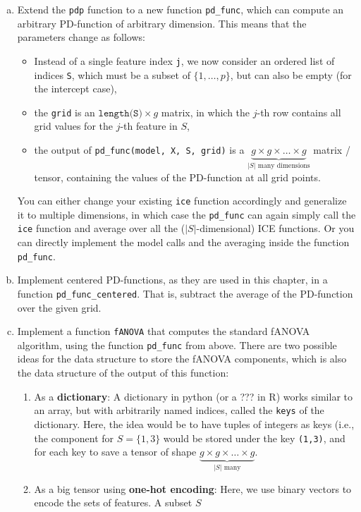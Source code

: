 {\begin{enumerate}[a)]
    \item
    Extend the \texttt{pdp} function to a new function \texttt{pd\_func}, which can compute an arbitrary PD-function of arbitrary dimension.
    This means that the parameters change as follows:
    \begin{itemize}
        \item Instead of a single feature index \texttt{j}, we now consider an ordered list of indices \texttt{S}, which must be a subset of $\{1, \dots, p\}$, but can also be empty (for the intercept case),
        \item the \texttt{grid} is an $\texttt{length(S)} \times g$ matrix, in which the $j$-th row contains all grid values for the $j$-th feature in $S$,
        \item the output of \texttt{pd\_func(model, X, S, grid)} is a $\underbrace{g \times g \times \dots \times g}_{|S| \text{ many dimensions}}$ matrix / tensor, containing the values of the PD-function at all grid points.
    \end{itemize}
    You can either change your existing \texttt{ice} function accordingly and generalize it to multiple dimensions, in which case the \texttt{pd\_func} can again simply call the \texttt{ice} function and average over all the ($|S|$-dimensional) ICE functions.
    Or you can directly implement the model calls and the averaging inside the function \texttt{pd\_func}.

    \item 
    Implement centered PD-functions, as they are used in this chapter, in a function \texttt{pd\_func\_centered}.
    That is, subtract the average of the PD-function over the given grid.

    \item
    Implement a function \texttt{fANOVA} that computes the standard fANOVA algorithm, using the function \texttt{pd\_func} from above.
    There are two possible ideas for the data structure to store the fANOVA components, which is also the data structure of the output of this function:
    \begin{enumerate}
        \item As a \textbf{dictionary}:
        A dictionary in python (or a ??? in R) works similar to an array, but with arbitrarily named indices, called the \texttt{keys} of the dictionary.
        Here, the idea would be to have tuples of integers as keys (i.e., the component for $S = \{1,3\}$ would be stored under the key \texttt{(1,3)}, and for each key to save a tensor of shape $\underbrace{g \times g \times \dots \times g}_{|S| \text{ many}}$.
        \item As a big tensor using \textbf{one-hot encoding}:
        Here, we use binary vectors to encode the sets of features.
        A subset $S$
    \end{enumerate}


\end{enumerate}}
